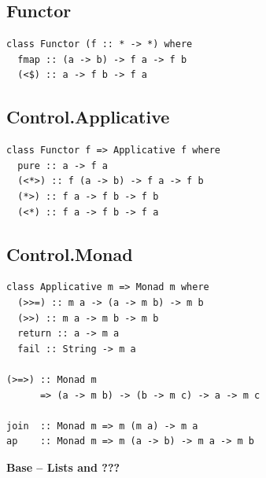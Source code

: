 \begin{multicols}{2}

\begin{box1}
\subsection *{Functor}

\begin{verbatim}
class Functor (f :: * -> *) where
  fmap :: (a -> b) -> f a -> f b
  (<$) :: a -> f b -> f a
\end{verbatim}
\end{box1}

\begin{box2}
\subsection *{Control.Applicative}
\begin{verbatim}
class Functor f => Applicative f where
  pure :: a -> f a
  (<*>) :: f (a -> b) -> f a -> f b
  (*>) :: f a -> f b -> f b
  (<*) :: f a -> f b -> f a
\end{verbatim}
\end{box2}

\begin{box1}
\subsection *{Control.Monad}
\begin{verbatim}
class Applicative m => Monad m where
  (>>=) :: m a -> (a -> m b) -> m b
  (>>) :: m a -> m b -> m b
  return :: a -> m a
  fail :: String -> m a

(>=>) :: Monad m
      => (a -> m b) -> (b -> m c) -> a -> m c

join  :: Monad m => m (m a) -> m a
ap    :: Monad m => m (a -> b) -> m a -> m b
\end{verbatim}

\end{box1}

\end{multicols}
\newpage

{\huge \bfseries Base -- Lists and ??? \\[0.2cm]}

\HRule%

